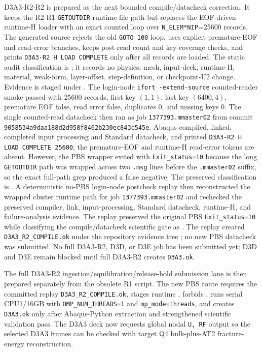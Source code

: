 D3A3-R2-R2 is prepared as the next bounded compile/datacheck correction. It
keeps the R2-R1 \texttt{GETOUTDIR} runtime-file path but replaces the
EOF-driven runtime-H loader with an exact counted loop over
\texttt{N\_ELEM*NIP}=25600 records. The generated source rejects the old
\texttt{GOTO 100} loop, uses explicit premature-EOF and read-error branches,
keeps post-read count and key-coverage checks, and prints
\texttt{D3A3-R2 H LOAD COMPLETE} only after all records are loaded. The static
audit classification is
; it records no physics, mesh,
input-deck, runtime-H, material, weak-form, layer-offset, step-definition, or
checkpoint-U2 change. Evidence is staged under
.
The login-node \texttt{ifort -extend-source} counted-reader smoke passed with
25600 records, first key $(1,1)$, last key $(6400,4)$, premature EOF false,
read error false, duplicates 0, and missing keys 0.
The single counted-read datacheck then ran as job
\texttt{1377393.mmaster02} from commit
\texttt{9058534a9daa188d2d958f8462b230ec843c545e}. Abaqus compiled, linked,
completed input processing and Standard datacheck, and printed
\texttt{D3A3-R2 H LOAD COMPLETE 25600}; the premature-EOF and runtime-H
read-error tokens are absent. However, the PBS wrapper exited with
\texttt{Exit\_status=10} because the long \texttt{GETOUTDIR} path was wrapped
across two \texttt{.msg} lines before the \texttt{.mmaster02} suffix, so the
exact full-path grep produced a false negative. The preserved classification is
.
A deterministic no-PBS login-node postcheck replay then reconstructed the
wrapped cluster runtime path for job \texttt{1377393.mmaster02} and rechecked
the preserved compiler, link, input-processing, Standard datacheck, runtime-H,
and failure-analysis evidence. The replay preserved the original PBS
\texttt{Exit\_status=10} while classifying the compile/datacheck scientific
gate as
. The replay
created \texttt{D3A3\_R2\_COMPILE.ok} under the repository evidence tree
;
no new PBS datacheck was submitted. No full D3A3-R2, D3D, or D3E job has been
submitted yet; D3D and D3E remain blocked until full D3A3-R2 creates
\texttt{D3A3.ok}.

The full D3A3-R2 ingestion/equilibration/release-hold submission lane is then
prepared separately from the obsolete R1 script. The new PBS route requires the
committed replay \texttt{D3A3\_R2\_COMPILE.ok}, stages runtime
, forbids , runs serial
CPU1/16GB with \texttt{OMP\_NUM\_THREADS=1} and \texttt{mp\_mode=threads}, and
creates \texttt{D3A3.ok} only after Abaqus-Python extraction and strengthened
scientific validation pass. The D3A3 deck now requests global nodal
\texttt{U, RF} output so the selected D3A3 frames can be checked with target
Q4 bulk-plus-AT2 fracture-energy reconstruction.

